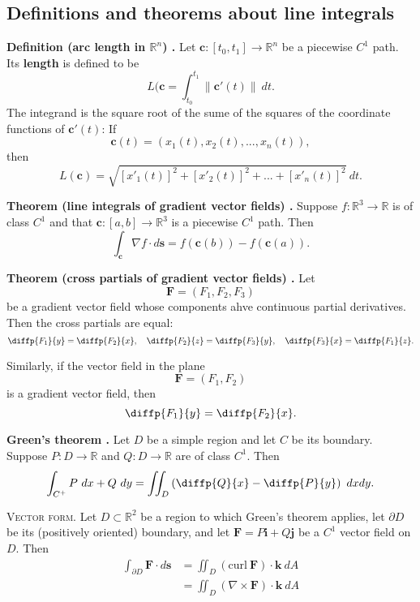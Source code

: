 \subsection{Definitions and theorems about line integrals}

\begin{shaded}
\textbf{Definition (arc length in $\mathbb{R}^n$) \cite{marsden_vector_calculus}.} Let $\mathbf{c}: [t_0, t_1] \to \mathbb{R}^n$ be a piecewise $C^1$ path. Its \textbf{length} is defined to be
$$ L(\mathbf{c} = \int_{t_0}^{t_1} \lVert \mathbf{c}'(t) \rVert \ dt . $$
The integrand is the square root of the sume of the squares of the coordinate functions of $\mathbf{c}'(t)$: If
$$ \mathbf{c}(t) = (x_1(t), x_2(t), ..., x_n(t)) , $$
then
$$ L(\mathbf{c}) = \sqrt{[x'_1(t)]^2 + [x'_2(t)]^2 + ... + [x'_n(t)]^2} \ dt . $$
\end{shaded}

\begin{shaded}
\textbf{Theorem (line integrals of gradient vector fields) \cite{marsden_vector_calculus}.} Suppose $f : \mathbb{R}^3 \to \mathbb{R}$ is of class $C^1$ and that $\mathbf{c} : [a, b] \to \mathbb{R}^3$ is a piecewise $C^1$ path. Then
$$ \int_{\mathbf{c}} \nabla f \cdot d\mathbf{s} = f(\mathbf{c}(b)) - f(\mathbf{c}(a)) . $$
\end{shaded}

\begin{shaded}
\textbf{Theorem (cross partials of gradient vector fields) \cite{math2111_notes}.} Let
$$ \mathbf{F} = (F_1, F_2, F_3) $$
be a gradient vector field whose components ahve continuous partial derivatives. Then the cross partials are equal:
$$ \diffp{F_1}{y} = \diffp{F_2}{x}, \quad \diffp{F_2}{z} = \diffp{F_3}{y}, \quad \diffp{F_3}{x} = \diffp{F_1}{z} . $$

Similarly, if the vector field in the plane
$$ \mathbf{F} = (F_1, F_2) $$
is a gradient vector field, then
$$ \diffp{F_1}{y} = \diffp{F_2}{x} . $$
\end{shaded}

\begin{shaded}
\textbf{Green's theorem \cite{marsden_vector_calculus}.} Let $D$ be a simple region and let $C$ be its boundary. Suppose $P: D \to \mathbb{R}$ and $Q: D \to \mathbb{R}$ are of class $C^1$. Then
$$ \int_{C^+} P \ dx + Q \ dy = \iint_D \left( \diffp{Q}{x} - \diffp{P}{y} \right) \ dx dy . $$

\textsc{Vector form.} Let $D \subset \mathbb{R}^2$ be a region to which Green's theorem applies, let $\partial D$ be its (positively oriented) boundary, and let $\mathbf{F} = P \mathbf{i} + Q \mathbf{j}$ be a $C^1$ vector field on $D$. Then
\begin{align*}
\int_{\partial D} \mathbf{F} \cdot d\mathbf{s} &= \iint_D (\text{curl} \ \mathbf{F}) \cdot \mathbf{k} \ dA \\
&= \iint_D (\nabla \times \mathbf{F}) \cdot \mathbf{k} \ dA
\end{align*}
\end{shaded}

